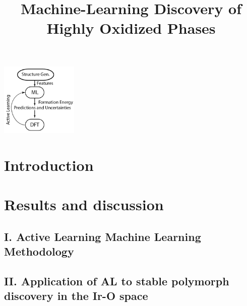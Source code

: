 \documentclass[journal=jacsat,manuscript=article]{achemso}
\title[ML discovered IrOx phases]{
  Machine-Learning Discovery of Highly Oxidized \IrOx Phases}
\begin{document}
\begin{tocentry}
\begin{center}
\includegraphics[height=3.5cm]{02_figures/Surrogate_model}
\end{center}
\end{tocentry}


\begin{abstract}

\end{abstract}

\section{Introduction}


\section{Results and discussion}

  \subsection{I. Active Learning Machine Learning Methodology}
  

  \subsection{II. Application of AL to stable polymorph discovery in the Ir-O space}
  
\end{document}
